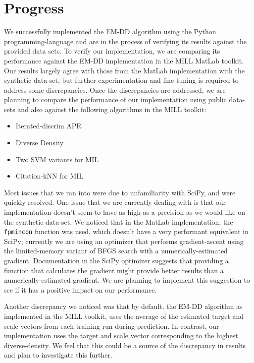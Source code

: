 \documentclass[conference]{IEEEtran}
\begin{document}
\section{Progress}

We successfully implemented the EM-DD algorithm using the Python programming-language and are in the process of verifying its results against the provided data sets. To verify our implementation, we are comparing its performance against the EM-DD implementation in the MILL MatLab toolkit\cite{MILLToolkit}. Our results largely agree with those from the MatLab implementation with the synthetic data-set, but further experimentation and fine-tuning is required to address some discrepancies. Once the discrepancies are addressed, we are planning to compare the performance of our implementation using public data-sets and also against the following algorithms in the MILL toolkit:

\begin{itemize}
	\item Iterated-discrim APR
	\item Diverse Density
	\item Two SVM variants for MIL
	\item Citation-kNN for MIL
\end{itemize}

Most issues that we ran into were due to unfamiliarity with SciPy, and were quickly resolved. One issue that we are currently dealing with is that our implementation doesn't seem to have as high as a precision as we would like on the synthetic data-set. We noticed that in the MatLab implementation, the \texttt{fpmincon} function was used, which doesn't have a very performant equivalent in SciPy; currently we are using an optimizer that performs gradient-ascent using the limited-memory variant of BFGS search with a numerically-estimated gradient. Documentation in the SciPy optimizer suggests that providing a function that calculates the gradient might provide better results than a numerically-estimated gradient. We are planning to implement this suggestion to see if it has a positive impact on our performance.

Another discrepancy we noticed was that by default, the EM-DD algorithm as implemented in the MILL toolkit, uses the average of the estimated target and scale vectors from each training-run during prediction. In contrast, our implementation uses the target and scale vector corresponding to the highest diverse-density. We feel that this could be a source of the discrepancy in results and plan to investigate this further.
\end{document}
